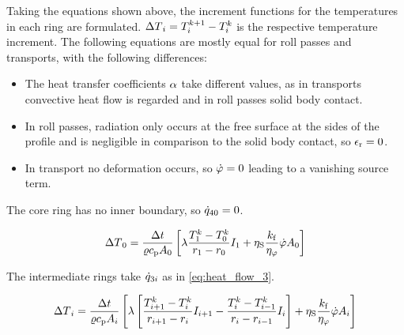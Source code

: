 \documentclass{PyRollDocs}
\begin{document}
    Taking the equations shown above, the increment functions for the temperatures in each ring are formulated.
    ${\Delta T}_{i} = {T}_{{i}}^{{k}+1} - {T}_{{i}}^{{k}}$ is the respective temperature increment.
    The following equations are mostly equal for roll passes and transports, with the following differences:
    \begin{itemize}
        \item The heat transfer coefficients ${\alpha}$ take different values, as in transports convective heat flow is regarded and in roll passes solid body contact.
        \item In roll passes, radiation only occurs at the free surface at the sides of the profile and is negligible in comparison to the solid body contact, so ${\epsilon_\mathrm{r}} = 0$.
        \item In transport no deformation occurs, so ${\dot{\varphi}}=0$ leading to a vanishing source term.
    \end{itemize}

    \noindent The core ring has no inner boundary, so ${\dot{q}}_{40} = 0$.

    \begin{equation}
        {\Delta T}_0 = \frac{{\Delta t}}{{\varrho}{c_\mathrm{p}}{A}_0} \left[
            {\lambda} \frac{{T}_{1}^{k} - {T}_0^{k}}{{r}_{1}-{r}_{0}}
            {I}_{1}
            + {\eta_\mathrm{S}} \frac{{k_\mathrm{f}}}{{\eta_\varphi}} {\dot{\varphi}} {A}_0 \right]
        \label{eq:increment_core}
    \end{equation}

    \noindent The intermediate rings take ${\dot{q}}_{3{i}}$ as in \autoref{eq:heat_flow_3}.

    \begin{equation}
        {\Delta T}_{i} = \frac{{\Delta t}}{{\varrho}{c_\mathrm{p}}{A}_{i}}
        \left[
            {\lambda} \left[
                \frac{{T}_{{i}+1}^{k} - {T}_{i}^{k}}{{r}_{{i}+1}-{r}_{{i}}}
                {I}_{{i}+1}
                -\frac{{T}_{{i}}^{k} - {T}_{{i}-1}^{k}}{{r}_{{i}}-{r}_{{i}-1}}
                {I}_{{i}}
                \right]
            + {\eta_\mathrm{S}} \frac{{k_\mathrm{f}}}{{\eta_\varphi}} {\dot{\varphi}} {A}_{{i}}
            \right]
        \label{eq:increment_layer}
    \end{equation}
\end{document}
